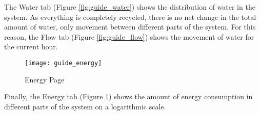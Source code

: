 The Water tab (Figure \ref{fig:guide_water}) shows the distribution of water in the system. As everything is completely recycled, there is no net change in the total amount of water, only movement between different parts of the system. For this reason, the Flow tab (Figure \ref{fig:guide_flow}) shows the movement of water for the current hour.

\begin{figure}[p]
    \centering
    \texttt{[image: guide\_energy]}
    \caption{Energy Page}
    \label{fig:guide_energy}
\end{figure}

Finally, the Energy tab (Figure \ref{fig:guide_energy}) shows the amount of energy consumption in different parts of the system on a logarithmic scale.